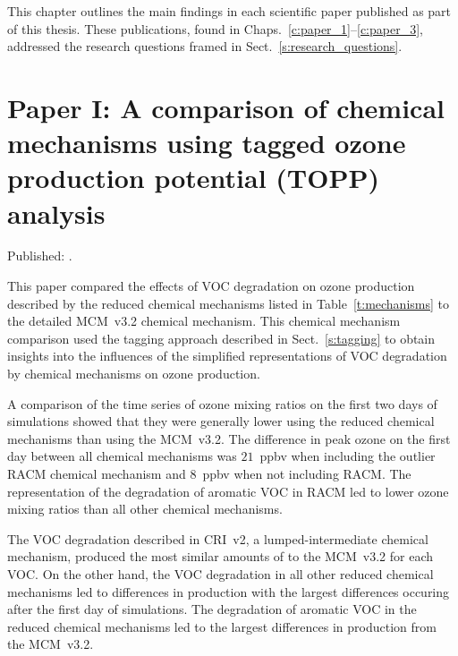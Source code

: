 This chapter outlines the main findings in each scientific paper published as part of this thesis.
These publications, found in Chaps.~\ref{c:paper_1}--\ref{c:paper_3}, addressed the research questions framed in Sect.~\ref{s:research_questions}.

\singlespacing
\section[Paper I]{Paper I: A comparison of chemical mechanisms using tagged ozone production potential (TOPP) analysis} \label{s:chemical_mechanism_results}

\onehalfspacing

\noindent
Published: .

This paper compared the effects of VOC degradation on ozone production described by the reduced chemical mechanisms listed in Table~\ref{t:mechanisms} to the detailed MCM~v3.2 chemical mechanism.
This chemical mechanism comparison used the tagging approach described in Sect.~\ref{s:tagging} to obtain insights into the influences of the simplified representations of VOC degradation by chemical mechanisms on ozone production.

A comparison of the time series of ozone mixing ratios on the first two days of simulations showed that they were generally lower using the reduced chemical mechanisms than using the MCM~v3.2.
The difference in peak ozone on the first day between all chemical mechanisms was $21$~ppbv when including the outlier RACM chemical mechanism and $8$~ppbv when not including RACM.
The representation of the degradation of aromatic VOC in RACM led to lower ozone mixing ratios than all other chemical mechanisms.

The VOC degradation described in CRI~v2, a lumped-intermediate chemical mechanism, produced the most similar amounts of  to the MCM~v3.2 for each VOC.
On the other hand, the VOC degradation in all other reduced chemical mechanisms led to differences in  production with the largest differences occuring after the first day of simulations.
The degradation of aromatic VOC in the reduced chemical mechanisms led to the largest differences in  production from the MCM~v3.2.

